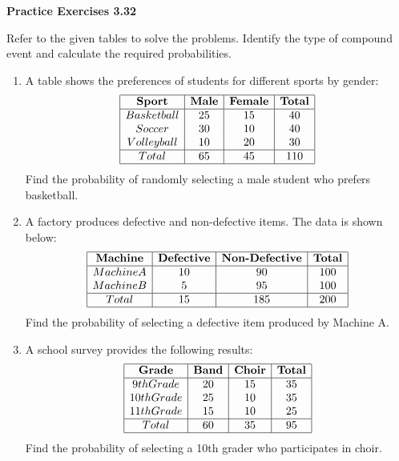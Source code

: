 \vspace{0.3ex}
\noindent\textbf{Practice Exercises 3.32}

\vspace{0.2ex}

Refer to the given tables to solve the problems. Identify the type of compound event and calculate the required probabilities.

\begin{enumerate}[label=\color{blue}\arabic*.]
    \item A table shows the preferences of students for different sports by gender:
    \[
    \begin{array}{|c|c|c|c|}
        \hline
        \textbf{Sport} & \textbf{Male} & \textbf{Female} & \textbf{Total} \\
        \hline
        Basketball & 25 & 15 & 40 \\
        Soccer & 30 & 10 & 40 \\
        Volleyball & 10 & 20 & 30 \\
        \hline
        Total & 65 & 45 & 110 \\
        \hline
    \end{array}
    \]
    Find the probability of randomly selecting a male student who prefers basketball.
    
    \item A factory produces defective and non-defective items. The data is shown below:
    \[
    \begin{array}{|c|c|c|c|}
        \hline
        \textbf{Machine} & \textbf{Defective} & \textbf{Non-Defective} & \textbf{Total} \\
        \hline
        Machine A & 10 & 90 & 100 \\
        Machine B & 5 & 95 & 100 \\
        \hline
        Total & 15 & 185 & 200 \\
        \hline
    \end{array}
    \]
    Find the probability of selecting a defective item produced by Machine A.
    
    \item A school survey provides the following results:
    \[
    \begin{array}{|c|c|c|c|}
        \hline
        \textbf{Grade} & \textbf{Band} & \textbf{Choir} & \textbf{Total} \\
        \hline
        9th Grade & 20 & 15 & 35 \\
        10th Grade & 25 & 10 & 35 \\
        11th Grade & 15 & 10 & 25 \\
        \hline
        Total & 60 & 35 & 95 \\
        \hline
    \end{array}
    \]
    Find the probability of selecting a 10th grader who participates in choir.
    

\end{enumerate}
